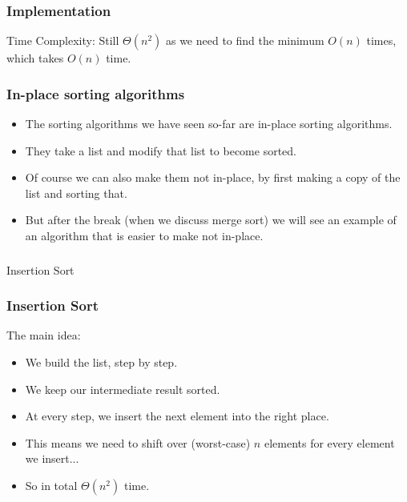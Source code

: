 \begin{frame}
	\frametitle{Implementation}
Time Complexity: 		Still $\Theta(n^2)$ as we need to find the minimum $O(n)$ times, which takes $O(n)$ time.
	
\end{frame}


\begin{frame}
	\frametitle{In-place sorting algorithms}

	\begin{itemize}
		\item The sorting algorithms we have seen so-far are \alert{in-place} sorting algorithms.
			
		\item They take a list and modify that list to become sorted.
			
		\item Of course we can also make them not in-place, by first making a copy of the list and sorting that.
			
		\item But after the break (when we discuss merge sort) we will see an example of an algorithm that is easier to make
			not in-place.
	\end{itemize}
\end{frame}

\begin{frame}[fragile]\frametitle{}
\begin{center}
{\Large Insertion Sort}
\end{center}

\end{frame}

\begin{frame}
	\frametitle{Insertion Sort}

			The main idea:
			\begin{itemize}
				\item We build the list, step by step.
					
				\item We keep our intermediate result sorted.
					
				\item At every step, we insert the next element into the right place.
					
				\item This means we need to shift over (worst-case) $n$ elements for every element we insert...
					
				\item So in total $\Theta(n^2)$ time.
			\end{itemize}

\end{frame}

